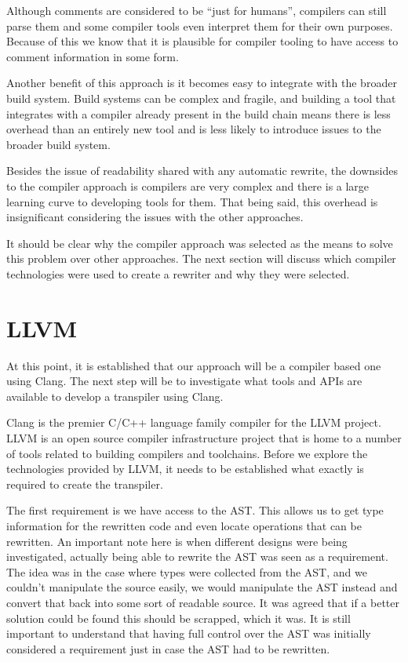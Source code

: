 Although comments are considered to be ``just for humans'', compilers can still parse them and some compiler tools even interpret them for their own purposes. Because of this we know that it is plausible for compiler tooling to have access to comment information in some form.

Another benefit of this approach is it becomes easy to integrate with the broader build system. Build systems can be complex and fragile, and building a tool that integrates with a compiler already present in the build chain means there is less overhead than an entirely new tool and is less likely to introduce issues to the broader build system.

Besides the issue of readability shared with any automatic rewrite, the downsides to the compiler approach is compilers are very complex and there is a large learning curve to developing tools for them. That being said, this overhead is insignificant considering the issues with the other approaches.

It should be clear why the compiler approach was selected as the means to solve this problem over other approaches. The next section will discuss which compiler technologies were used to create a rewriter and why they were selected.

\section{LLVM}

At this point, it is established that our approach will be a compiler based one using Clang. The next step will be to investigate what tools and APIs are available to develop a transpiler using Clang.

Clang is the premier C/C++ language family compiler for the LLVM project. LLVM is an open source compiler infrastructure project that is home to a number of tools related to building compilers and toolchains. Before we explore the technologies provided by LLVM, it needs to be established what exactly is required to create the transpiler.

The first requirement is we have access to the AST. This allows us to get type information for the rewritten code and even locate operations that can be rewritten. An important note here is when different designs were being investigated, actually being able to rewrite the AST was seen as a requirement. The idea was in the case where types were collected from the AST, and we couldn't manipulate the source easily, we would manipulate the AST instead and convert that back into some sort of readable source. It was agreed that if a better solution could be found this should be scrapped, which it was. It is still important to understand that having full control over the AST was initially considered a requirement just in case the AST had to be rewritten.

